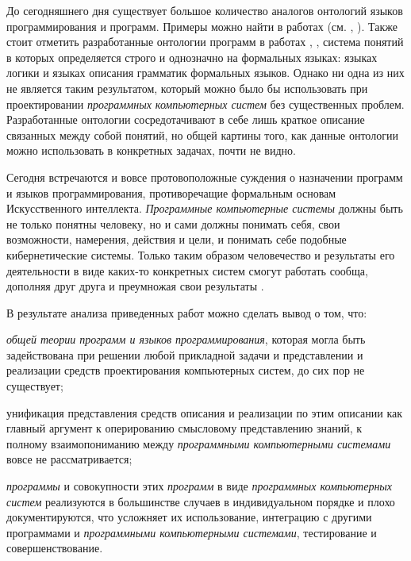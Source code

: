До сегодняшнего дня существует большое количество аналогов онтологий языков программирования и программ. Примеры можно найти в работах (см. , ). Также стоит отметить разработанные онтологии программ в работах , , система понятий в которых определяется строго и однозначно на формальных языках: языках логики и языках описания грамматик формальных языков. Однако ни одна из них не является таким результатом, который можно было бы использовать при проектировании \textit{программных компьютерных систем} без существенных проблем. Разработанные онтологии сосредотачивают в себе лишь краткое описание связанных между собой понятий, но общей картины того, как данные онтологии можно использовать в конкретных задачах, почти не видно.

Сегодня встречаются и вовсе протовоположные суждения о назначении программ и языков программирования, противоречащие формальным основам Искусственного интеллекта. \textit{Программные компьютерные системы} должны быть не только понятны человеку, но и сами должны понимать себя, свои возможности, намерения, действия и цели, и понимать себе подобные кибернетические системы. Только таким образом человечество и результаты его деятельности в виде каких-то конкретных систем смогут работать сообща, дополняя друг друга и преумножая свои результаты .

В результате анализа приведенных работ можно сделать вывод о том, что:
\begin{textitemize}
    \item \textit{общей теории программ и языков программирования}, которая могла быть задействована при решении любой прикладной задачи и представлении и реализации средств проектирования компьютерных систем, до сих пор не существует;
    \item унификация представления средств описания и реализации по этим описании как главный аргумент к оперированию смысловому представлению знаний, к полному взаимопониманию между \textit{программными компьютерными системами} вовсе не рассматривается;
    \item \textit{программы} и совокупности этих \textit{программ} в виде \textit{программных компьютерных систем} реализуются в большинстве случаев в индивидуальном порядке и плохо документируются, что усложняет их использование, интеграцию с другими программами и \textit{программными компьютерными системами}, тестирование и совершенствование.
\end{textitemize}

